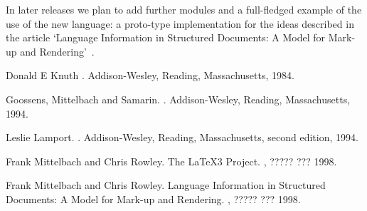\documentclass{article}
\begin{document}
In later releases we plan to add further modules and a full-fledged
example of the use of the new language: a proto-type implementation
for the ideas described in the article `Language Information in
Structured Documents: A Model for Mark-up and
Rendering'~\cite{tub:MR98-2}.

\begin{thebibliography}{1}

Donald E Knuth
.
\newblock Addison-Wesley, Reading, Massachusetts, 1984.

Goossens, Mittelbach and Samarin.
.
\newblock Addison-Wesley, Reading, Massachusetts, 1994.

Leslie Lamport.
.
\newblock Addison-Wesley, Reading, Massachusetts, second edition, 1994.

Frank Mittelbach and Chris Rowley.
\newblock The {\LaTeX3} Project.
, ????? ??? 1998.

Frank Mittelbach and Chris Rowley.
\newblock Language Information in
Structured Documents: A Model for Mark-up and Rendering.
, ????? ??? 1998.

\end{thebibliography}
\end{document}
